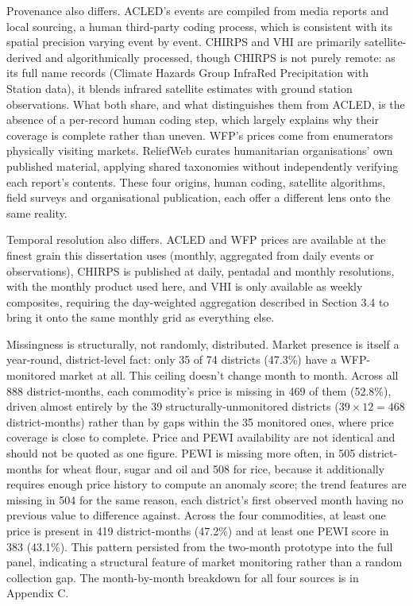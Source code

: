 \documentclass[12pt,a4paper]{article}
\begin{document}
Provenance also differs. ACLED's events are compiled from media reports and local sourcing, a human third-party coding process, which is consistent with its spatial precision varying event by event. CHIRPS and VHI are primarily satellite-derived and algorithmically processed, though CHIRPS is not purely remote: as its full name records (Climate Hazards Group InfraRed Precipitation with Station data), it blends infrared satellite estimates with ground station observations. What both share, and what distinguishes them from ACLED, is the absence of a per-record human coding step, which largely explains why their coverage is complete rather than uneven. WFP's prices come from enumerators physically visiting markets. ReliefWeb curates humanitarian organisations' own published material, applying shared taxonomies without independently verifying each report's contents. These four origins, human coding, satellite algorithms, field surveys and organisational publication, each offer a different lens onto the same reality.

Temporal resolution also differs. ACLED and WFP prices are available at the finest grain this dissertation uses (monthly, aggregated from daily events or observations), CHIRPS is published at daily, pentadal and monthly resolutions, with the monthly product used here, and VHI is only available as weekly composites, requiring the day-weighted aggregation described in Section 3.4 to bring it onto the same monthly grid as everything else.

Missingness is structurally, not randomly, distributed. Market presence is itself a year-round, district-level fact: only 35 of 74 districts (47.3\%) have a WFP-monitored market at all. This ceiling doesn't change month to month. Across all 888 district-months, each commodity's price is missing in 469 of them (52.8\%), driven almost entirely by the 39 structurally-unmonitored districts ($39 \times 12 = 468$ district-months) rather than by gaps within the 35 monitored ones, where price coverage is close to complete. Price and PEWI availability are not identical and should not be quoted as one figure. PEWI is missing more often, in 505 district-months for wheat flour, sugar and oil and 508 for rice, because it additionally requires enough price history to compute an anomaly score; the trend features are missing in 504 for the same reason, each district's first observed month having no previous value to difference against. Across the four commodities, at least one price is present in 419 district-months (47.2\%) and at least one PEWI score in 383 (43.1\%). This pattern persisted from the two-month prototype into the full panel, indicating a structural feature of market monitoring rather than a random collection gap. The month-by-month breakdown for all four sources is in Appendix C.
\end{document}
